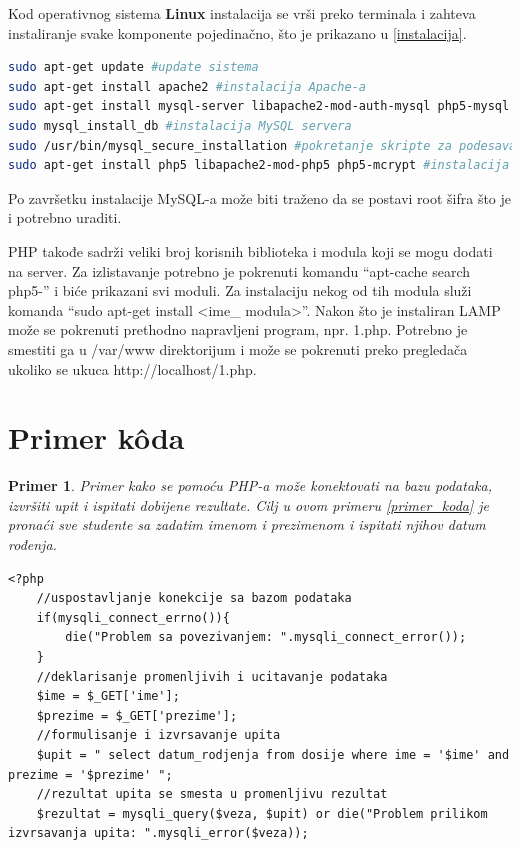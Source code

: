 \documentclass[a4paper]{article}
\newtheorem{primer}{Primer}[section]
\begin{document}
{Kod operativnog sistema \textbf{Linux} instalacija se vrši preko terminala i zahteva instaliranje svake komponente pojedinačno, što je prikazano u \ref{instalacija}. 

\begin{lstlisting}[language=bash, caption={Pokretanje instalacije na Linux operativnom sistemu}, label={instalacija}]
sudo apt-get update #update sistema
sudo apt-get install apache2 #instalacija Apache-a
sudo apt-get install mysql-server libapache2-mod-auth-mysql php5-mysql #instalacija MySQL-a
sudo mysql_install_db #instalacija MySQL servera
sudo /usr/bin/mysql_secure_installation #pokretanje skripte za podesavanje MySQL-a
sudo apt-get install php5 libapache2-mod-php5 php5-mcrypt #instalacija PHP-a

\end{lstlisting}
Po završetku instalacije MySQL-a može biti traženo da se postavi root šifra što je i potrebno uraditi.

PHP takođe sadrži veliki broj korisnih biblioteka i modula koji se mogu dodati na  server. Za izlistavanje potrebno je pokrenuti komandu “apt-cache search php5-” i biće prikazani svi moduli. Za instalaciju nekog od tih modula služi komanda “sudo apt-get install <ime\_ modula>”. Nakon što je instaliran LAMP može se pokrenuti prethodno napravljeni program, npr. 1.php. Potrebno je smestiti ga u /var/www direktorijum i može se pokrenuti preko pregledača ukoliko se ukuca http://localhost/1.php. 

\section{Primer k\^{o}da}
\begin{primer}
Primer kako se pomoću PHP-a može konektovati na bazu podataka, izvršiti upit i ispitati dobijene rezultate. Cilj u ovom primeru \ref{primer_koda} je pronaći sve studente sa zadatim imenom i prezimenom i ispitati njihov datum rođenja.
\end{primer}


\begin{lstlisting}[caption={Primer PHP k\^{o}da},frame=single, label=primer_koda]
<?php
	//uspostavljanje konekcije sa bazom podataka
	if(mysqli_connect_errno()){
		die("Problem sa povezivanjem: ".mysqli_connect_error());
	}
	//deklarisanje promenljivih i ucitavanje podataka
	$ime = $_GET['ime'];
	$prezime = $_GET['prezime'];
	//formulisanje i izvrsavanje upita
	$upit = " select datum_rodjenja from dosije where ime = '$ime' and prezime = '$prezime' ";
	//rezultat upita se smesta u promenljivu rezultat
	$rezultat = mysqli_query($veza, $upit) or die("Problem prilikom izvrsavanja upita: ".mysqli_error($veza));
	

\end{lstlisting}}
\end{document}
